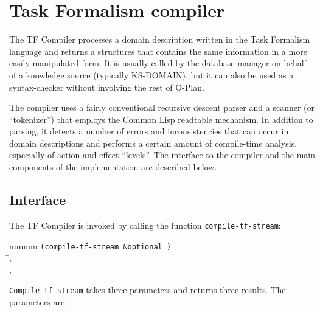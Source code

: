

\raggedbottom





\tableofcontents

\newpage

\section{Task Formalism compiler}

The TF Compiler processes a domain description written in the Task
Formalism language and returns a structures that contains the same
information in a more easily manipulated form.  It is usually called
by the database manager on behalf of a knowledge source (typically
KS-DOMAIN), but it can also be used as a syntax-checker without
involving the rest of O-Plan.

The compiler uses a fairly conventional recursive descent parser and
a scanner (or ``tokenizer'') that employs the Common Lisp readtable
mechanism.  In addition to parsing, it detects a number of errors and
inconsistencies that can occur in domain descriptions and performs a
certain amount of compile-time analysis, especially of action and
effect ``levels''.  The interface to the compiler and the main
components of the implementation are described below.

\subsection{Interface}

The TF Compiler is invoked by calling the function
{\tt compile-tf-stream}:

\begin{tabbing}
mmmm\=\kill
{\tt (compile-tf-stream 
                        \&optional
                        )} \\
    \>\MapsTo \=, \\
    \>        \>, \\
    \>        \>
\end{tabbing}

\noindent
{\tt Compile-tf-stream} takes three parameters and returns three
results.  The parameters are:

